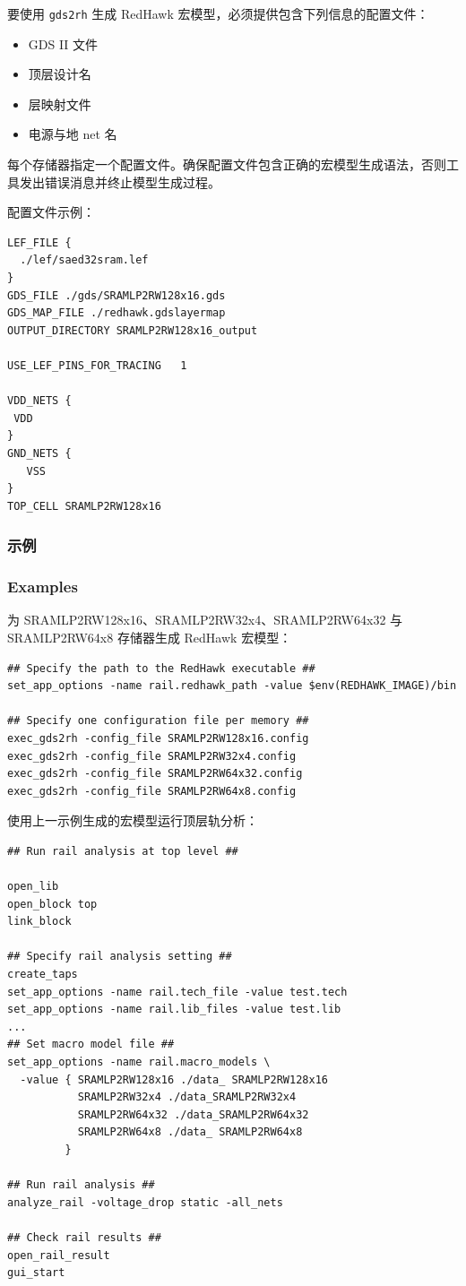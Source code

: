 要使用 \texttt{gds2rh} 生成 RedHawk 宏模型，必须提供包含下列信息的配置文件：
\begin{itemize}
  \item GDS II 文件
  \item 顶层设计名
  \item 层映射文件
  \item 电源与地 net 名
\end{itemize}

每个存储器指定一个配置文件。确保配置文件包含正确的宏模型生成语法，否则工具发出错误消息并终止模型生成过程。

配置文件示例：
\begin{lstlisting}
LEF_FILE {
  ./lef/saed32sram.lef
}
GDS_FILE ./gds/SRAMLP2RW128x16.gds
GDS_MAP_FILE ./redhawk.gdslayermap
OUTPUT_DIRECTORY SRAMLP2RW128x16_output

USE_LEF_PINS_FOR_TRACING   1

VDD_NETS {
 VDD
}
GND_NETS {
   VSS
}
TOP_CELL SRAMLP2RW128x16
\end{lstlisting}

\subsubsection{示例}
\subsubsection*{Examples}

为 SRAMLP2RW128x16、SRAMLP2RW32x4、SRAMLP2RW64x32 与 SRAMLP2RW64x8 存储器生成 RedHawk 宏模型：
\begin{lstlisting}
## Specify the path to the RedHawk executable ##
set_app_options -name rail.redhawk_path -value $env(REDHAWK_IMAGE)/bin

## Specify one configuration file per memory ##
exec_gds2rh -config_file SRAMLP2RW128x16.config
exec_gds2rh -config_file SRAMLP2RW32x4.config
exec_gds2rh -config_file SRAMLP2RW64x32.config
exec_gds2rh -config_file SRAMLP2RW64x8.config
\end{lstlisting}

使用上一示例生成的宏模型运行顶层轨分析：
\begin{lstlisting}
## Run rail analysis at top level ##

open_lib
open_block top
link_block

## Specify rail analysis setting ##
create_taps
set_app_options -name rail.tech_file -value test.tech
set_app_options -name rail.lib_files -value test.lib
...
## Set macro model file ##
set_app_options -name rail.macro_models \
  -value { SRAMLP2RW128x16 ./data_ SRAMLP2RW128x16
           SRAMLP2RW32x4 ./data_SRAMLP2RW32x4
           SRAMLP2RW64x32 ./data_SRAMLP2RW64x32
           SRAMLP2RW64x8 ./data_ SRAMLP2RW64x8
         }

## Run rail analysis ##
analyze_rail -voltage_drop static -all_nets

## Check rail results ##
open_rail_result
gui_start
\end{lstlisting}

